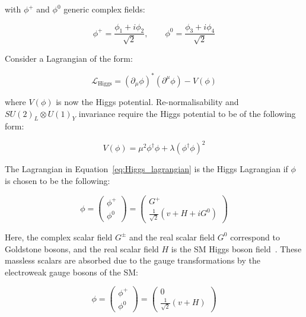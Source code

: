 			\noindent with $\phi^+$ and $\phi^0$ generic complex fields: 

			\begin{equation}
				\phi^+ = \frac{\phi_1 + i \phi_2}{\sqrt{2}},  \qquad \phi^0 = \frac{\phi_3 + i \phi_4}{\sqrt{2}}
			\end{equation}

			\noindent Consider a Lagrangian of the form: 

			\begin{equation}
			\label{eq:Higgs_lagrangian}
				\mathcal{L_{\mathrm{Higgs}}} = ( \partial_{\mu} \phi )^* \left ( \partial^{\mu} \phi \right ) - V(\phi)
			\end{equation}

			\noindent where $V(\phi)$ is now the Higgs potential. Re-normalisability and $SU(2)_L \otimes U(1)_Y$ invariance require the Higgs potential to be of the following form: 

			\begin{equation}
			\label{eq:Higgs_potential}
				V(\phi) = \mu^2  \phi^\dagger \phi + \lambda \left ( \phi^\dagger \phi \right )^2 
			\end{equation}

			\noindent The Lagrangian in Equation~\ref{eq:Higgs_lagrangian} is the Higgs Lagrangian if $\phi$ is chosen to be the following:

			\begin{equation*}
				\phi = 
				\begin{pmatrix}
					\phi^+ \\ \phi^0
				\end{pmatrix} 
				=
				\begin{pmatrix}
					G^+ \\ \frac{1}{\sqrt{2}} \left ( v + H + iG^0 \right )
				\end{pmatrix}
			\end{equation*}

			\noindent Here, the complex scalar field $G^\pm$ and the real scalar field $G^0$ correspond to Goldstone bosons, and the real scalar field $H$ is the \ac{SM} Higgs boson field~\cite{Goldstone1962}. These massless scalars are absorbed due to the gauge transformations by the electroweak gauge bosons of the \ac{SM}:

			\begin{equation}
			\label{eq:Higgs_doublet}
				\phi = 
				\begin{pmatrix}
					\phi^+ \\ \phi^0
				\end{pmatrix} 
				=
				\begin{pmatrix}
					0 \\ \frac{1}{\sqrt{2}} \left ( v + H \right )
				\end{pmatrix}
			\end{equation}


